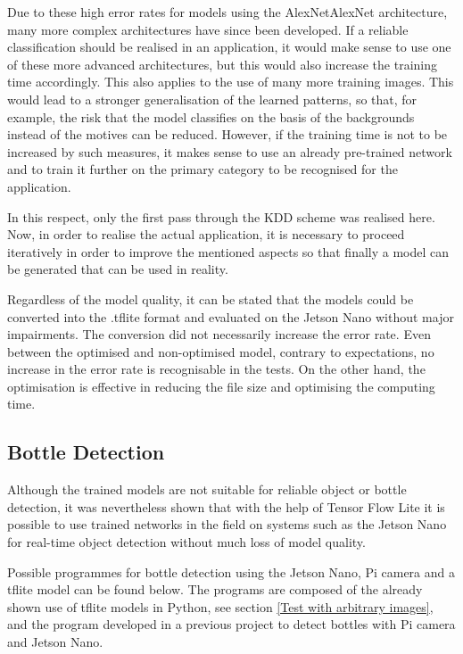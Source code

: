 Due to these high error rates for models using the AlexNet{AlexNet} architecture, many more complex architectures have since been developed.  If a reliable classification should be realised in an application, it would make sense to use one of these more advanced architectures, but this would also increase the training time accordingly. This also applies to the use of many more training images. This would lead to a stronger generalisation of the learned patterns, so that, for example, the risk that the model classifies on the basis of the backgrounds instead of the motives can be reduced. However, if the training time is not to be increased by such measures, it makes sense to use an already pre-trained network and to train it further on the primary category to be recognised for the application.

In this respect, only the first pass through the KDD scheme was realised here. Now, in order to realise the actual application, it is necessary to proceed iteratively in order to improve the mentioned aspects so that finally a model can be generated that can be used in reality. 

Regardless of the model quality, it can be stated that the models could be converted into the .tflite format and evaluated on the Jetson Nano without major impairments. The conversion did not necessarily increase the error rate. Even between the optimised and non-optimised model, contrary to expectations, no increase in the error rate is recognisable in the tests. On the other hand, the optimisation is effective in reducing the file size and optimising the computing time.

\subsection{Bottle Detection}

Although the trained models are not suitable for reliable object or bottle detection, it was nevertheless shown that with the help of Tensor Flow Lite it is possible to use trained networks in the field on systems such as the Jetson Nano for real-time object detection without much loss of model quality.

Possible programmes for bottle detection using the Jetson Nano, Pi camera and a tflite model can be found below. The programs are composed of the already shown use of tflite models in Python, see section \ref{Test with arbitrary images}, and the program developed in a previous project to detect bottles with Pi camera and Jetson Nano. 

